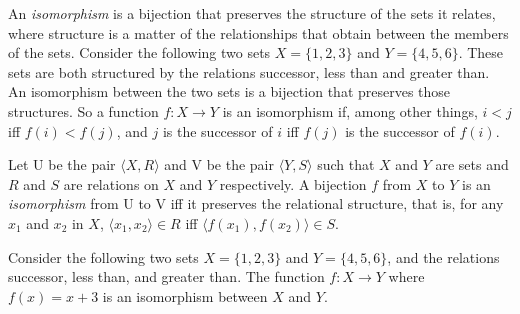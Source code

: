 \documentclass[../../../include/open-logic-section]{subfiles}
\begin{document}

\begin{explain}
An \emph{isomorphism} is a bijection that preserves the structure of the sets it relates, where structure is a matter of the relationships that obtain between the members of the sets. Consider the following two sets $X=\{1,2,3\}$ and $Y=\{4,5,6\}$. These sets are both structured by the relations successor, less than and greater than. An isomorphism between the two sets is a bijection that preserves those structures. So a function $f \colon X \to Y$ is an isomorphism if, among other things, $i<j$ iff $f(i)<f(j)$, and $j$ is the successor of $i$ iff $f(j)$ is the successor of $f(i)$.
\end{explain}

\begin{defn}
Let U be the pair $\langle X, R\rangle$ and V be the pair $\langle Y, S\rangle$ such that $X$ and $Y$ are sets and $R$ and $S$ are relations on $X$ and $Y$ respectively. A bijection $f$ from $X$ to $Y$ is an \emph{isomorphism}  from U to V iff it preserves the relational structure, that is, for any $x_{1}$ and $x_{2}$ in $X$, $\langle x_{1},x_{2}\rangle\in R$ iff $\langle f(x_{1}),f(x_{2})\rangle\in S$.
\end{defn}

\begin{ex}
Consider the following two sets $X=\{1,2,3\}$ and $Y=\{4,5,6\}$, and the relations successor, less than, and greater than. The function $f\colon X \to Y$ where $f(x) = x+3$ is an isomorphism between $X$ and $Y$.
\end{ex}
\end{document}
